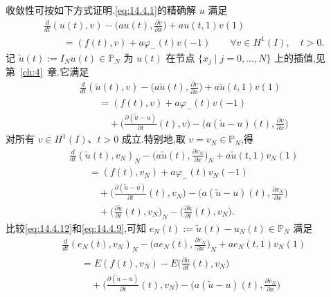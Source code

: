 收敛性可按如下方式证明.\eqref{eq:14.4.1}的精确解 \(u\) 满足
\begin{equation}\label{eq:14.4.11}
  \begin{aligned}
    &\frac{d}{dt}(u(t),v)-\biggl(au(t),\frac{\partial v}{\partial x}\biggr)+au(t,1)v(1)\\
    &\qquad=(f(t),v)+a\varphi_-(t)v(-1)\qquad\forall v\in H^1(I),\quad t>0.
  \end{aligned}
\end{equation}
记 \(\widetilde u(t):=I_Nu(t)\in\mathbb P_N\) 为 \(u(t)\) 在节点 \(\{x_j\mid j=0,\ldots,N\}\) 上的插值,见第~\ref{ch:4}~章.它满足
\[
  \begin{aligned}
    &\frac{d}{dt}(\widetilde u(t),v)
       -\biggl(a\widetilde u(t),\frac{\partial v}{\partial x}\biggr)
             +a\widetilde u(t,1)v(1)\\
    &\qquad=(f(t),v)+a\varphi_-(t)v(-1)\\
    &\qquad\quad+\biggl(\frac{\partial(\widetilde u-u)}{\partial t}(t),v\biggr)
           -\biggl(a(\widetilde u-u)(t),\frac{\partial v}{\partial x}\biggr)
  \end{aligned}
\]
对所有 \(v\in H^1(I)\)、\(t>0\) 成立.特别地,取 \(v=v_N\in\mathbb P_N\),得
\begin{equation}\label{eq:14.4.12}
  \begin{aligned}
    &\frac{d}{dt}(\widetilde u(t),v_N)_N
         -\biggl(a\widetilde u(t),\frac{\partial v_N}{\partial x}\biggr)_N
         +a\widetilde u(t,1)v_N(1)\\
    &\qquad=(f(t),v_N)+a\varphi_-(t)v_N(-1)\\
    &\qquad\quad+\biggl(\frac{\partial(\widetilde u-u)}{\partial t}(t),v_N\biggr)
       -\biggl(a(\widetilde u-u)(t),\frac{\partial v_N}{\partial x}\biggr)\\
    &\qquad\quad+\biggl(\frac{\partial\widetilde u}{\partial t}(t),v_N\biggr)_N
                 -\biggl(\frac{\partial\widetilde u}{\partial t}(t),v_N\biggr).
  \end{aligned}
\end{equation}
比较\eqref{eq:14.4.12}和\eqref{eq:14.4.9},可知 \(e_N(t):=\widetilde u(t)-u_N(t)\in\mathbb P_N\) 满足
\begin{equation}\label{eq:14.4.13}
  \begin{aligned}
    &\frac{d}{dt}(e_N(t),v_N)_N-\biggl(ae_N(t),\frac{\partial v_N}{\partial x}\biggr)_N
                +ae_N(t,1)v_N(1)\\
    &\qquad=E(f(t),v_N)-E\biggl(\frac{\partial\widetilde u}{\partial t}(t),v_N\biggr)\\
    &\qquad\quad+\biggl(\frac{\partial(\widetilde u-u)}{\partial t}(t),v_N\biggr)
           -\biggl(a(\widetilde u-u)(t),\frac{\partial v_N}{\partial x}\biggr)
  \end{aligned}
\end{equation}
